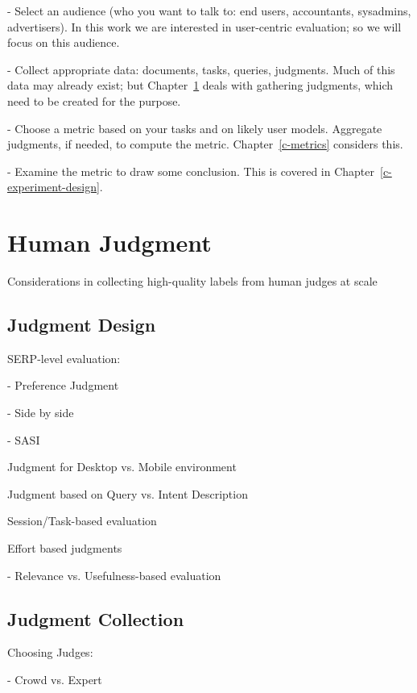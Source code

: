 \documentclass[openany]{now} %
\newcommand{\newpar}{\bigskip\noindent}
\begin{document}
- Select an audience (who you want to talk to: end users, accountants, sysadmins, advertisers). In this work we are interested in user-centric evaluation; so we will focus on this audience.

- Collect appropriate data: documents, tasks, queries, judgments. Much of this data may already exist; but Chapter~\ref{c-human-judgment} deals with gathering judgments, which need to be created for the purpose.

- Choose a metric based on your tasks and on likely user models. Aggregate judgments, if needed, to compute the metric. Chapter~\ref{c-metrics} considers this.

- Examine the metric to draw some conclusion. This is covered in Chapter~\ref{c-experiment-design}.

\chapter{Human Judgment}
\label{c-human-judgment}
Considerations in collecting high-quality labels from human judges at scale

\section{Judgment Design}

SERP-level evaluation: 

- Preference Judgment  \cite{Chandar2013} \cite{CarteretteBCD08}

- Side by side \cite{Thomas2006} \cite{Kim:2013}

- SASI \cite{Bailey2010} 

\newpar
Judgment for Desktop vs. Mobile environment \cite{Verma:2016:CRMD}

\newpar
Judgment based on Query vs. Intent Description \cite{Yilmaz:2014:EID}

\newpar
Session/Task-based evaluation \cite{Moraveji:2011} \cite{Xu:2009}

\newpar
Effort based judgments \cite{Yilmaz:2014} \cite{Verma:2016:EBJ}

- Relevance vs. Usefulness-based evaluation 

\section{Judgment Collection}

Choosing Judges: 

- Crowd vs. Expert \cite{Kazai:2013} \cite{Alonso20121053}
\end{document}
